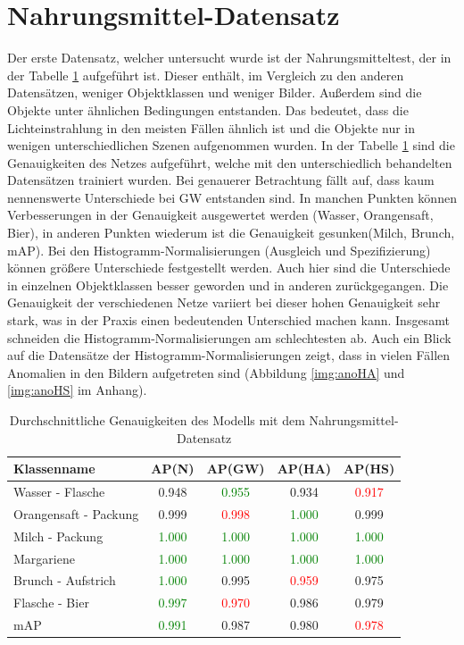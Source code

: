   \section{Nahrungsmittel-Datensatz}
Der erste Datensatz, welcher untersucht wurde ist der Nahrungsmitteltest, der in der Tabelle \ref{tab:nahrungsmitteltest} aufgeführt ist. Dieser enthält, im Vergleich zu den anderen Datensätzen, weniger Objektklassen und weniger Bilder. Außerdem sind die Objekte unter ähnlichen Bedingungen entstanden. Das bedeutet, dass die Lichteinstrahlung in den meisten Fällen ähnlich ist und die Objekte nur in wenigen unterschiedlichen Szenen aufgenommen wurden. In der Tabelle \ref{tab:nahrungsmitteltest} sind die Genauigkeiten des Netzes aufgeführt, welche mit den unterschiedlich behandelten Datensätzen trainiert wurden. Bei genauerer Betrachtung fällt auf, dass kaum nennenswerte Unterschiede bei GW entstanden sind. In manchen Punkten können Verbesserungen in der Genauigkeit ausgewertet werden (Wasser, Orangensaft, Bier), in anderen Punkten wiederum ist die Genauigkeit gesunken(Milch, Brunch, mAP). Bei den Histogramm-Normalisierungen (Ausgleich und Spezifizierung) können größere Unterschiede festgestellt werden. Auch hier sind die Unterschiede in einzelnen Objektklassen besser geworden und in anderen zurückgegangen. Die Genauigkeit der verschiedenen Netze variiert bei dieser hohen Genauigkeit sehr stark, was in der Praxis einen bedeutenden Unterschied machen kann. Insgesamt schneiden die Histogramm-Normalisierungen am schlechtesten ab. Auch ein Blick auf die Datensätze der Histogramm-Normalisierungen zeigt, dass in vielen Fällen Anomalien in den Bildern aufgetreten sind (Abbildung \ref{img:anoHA} und \ref{img:anoHS} im Anhang).
\begin{table}
[h]
\caption{Durchschnittliche Genauigkeiten des Modells mit dem Nahrungsmittel-Datensatz}
\centering
\begin{tabular}{|l|c|c|c|c|}
\hline
Klassenname & AP(N) & AP(GW) & AP(HA) & AP(HS)\\
\hline
Wasser - Flasche & 0.948 & \textcolor{green}{0.955} & 0.934 & \textcolor{red}{0.917}\\
Orangensaft - Packung & 0.999 & \textcolor{red}{0.998} & \textcolor{green}{1.000} & 0.999\\
Milch - Packung & \textcolor{green}{1.000} & \textcolor{green}{1.000} & \textcolor{green}{1.000} & \textcolor{green}{1.000}\\
Margariene & \textcolor{green}{1.000} & \textcolor{green}{1.000} & \textcolor{green}{1.000} & \textcolor{green}{1.000}\\
Brunch - Aufstrich & \textcolor{green}{1.000} & 0.995 & \textcolor{red}{0.959} & 0.975\\
Flasche - Bier & \textcolor{green}{0.997} & \textcolor{red}{0.970} & 0.986 & 0.979\\
\hline
mAP & \textcolor{green}{0.991} & 0.987 & 0.980 & \textcolor{red}{0.978}\\
\hline
\end{tabular}
\label{tab:nahrungsmitteltest}
\end{table}
